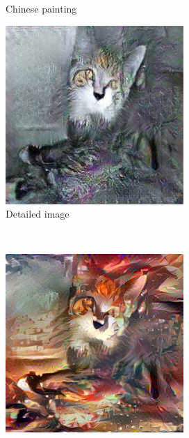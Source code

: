 \documentclass[10pt,twocolumn,letterpaper]{article}
\begin{document}
\begin{figure}
\begin{subfigure}[b]{0.18\textwidth}
    \caption{Chinese painting}
    \label{fig::base25}
  \end{subfigure}
  \caption{Baseline 2: Smoothing, extracting pencil sketh, and feeding the sketch to AWAST directly}
  \label{fig::sketchonly}
  \begin{subfigure}[b]{0.18\textwidth}
    \includegraphics[width=\textwidth]{figure/baseline3/canny.jpg}
    \caption{Detailed image}
    \label{fig::base31}
  \end{subfigure}
  ~
  \begin{subfigure}[b]{0.18\textwidth}
    \includegraphics[width=\textwidth]{figure/baseline3/yys.jpg}

\end{subfigure}
\end{figure}
\end{document}

